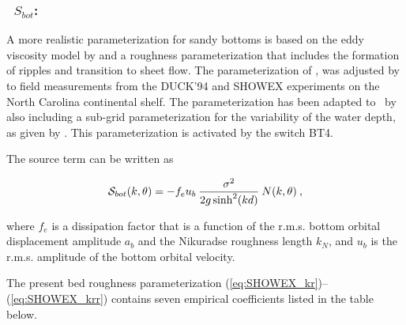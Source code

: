\vsssub
\subsubsection{~$S_{bot}$: \showex} \label{sec:BT4}
\vsssub


\noindent 
A more realistic parameterization for sandy bottoms is based on the eddy
viscosity model by \cite{art:GM79} and a roughness parameterization that
includes the formation of ripples and transition to sheet flow. The
parameterization of \cite{tol:JPO94}, was adjusted by \cite{art:Aea03a} to
field measurements from the DUCK'94 and SHOWEX experiments on the North
Carolina continental shelf. The parameterization has been adapted to \ws\ by
also including a sub-grid parameterization for the variability of the water
depth, as given by \cite{tol:CE95}. This parameterization is activated by the
switch BT4.

The source term can be written as


\begin{equation}
{\cal S}_{bot}(k,\theta) = - f_e u_b \: \frac{\sigma^2}{2 g \sinh^2(kd)} \: N(k,\theta)
\: , \label{eq:SHOWEX_bot}
\end{equation}

\noindent
where $f_e$ is a dissipation factor that is a function of the r.m.s. bottom orbital 
displacement amplitude $a_b$ and the Nikuradse roughness length $k_N$, and 
$u_b$ is the r.m.s. amplitude of the bottom orbital 
velocity.

The present bed roughness parameterization
(\ref{eq:SHOWEX_kr})--(\ref{eq:SHOWEX_krr}) contains seven empirical
coefficients listed in the table below.

